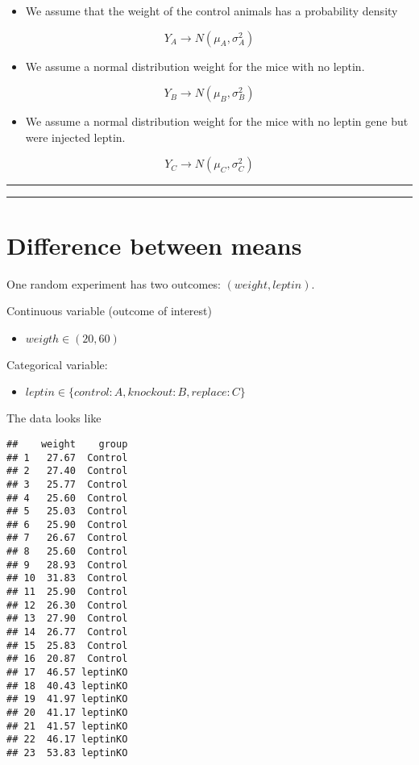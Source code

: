 \documentclass[
]{book}
\providecommand{\tightlist}{%
  \setlength{\itemsep}{0pt}\setlength{\parskip}{0pt}}
\begin{document}
\begin{itemize}
\tightlist
\item
  We assume that the weight of the control animals has a probability density
\end{itemize}

\[Y_A \rightarrow N(\mu_A, \sigma_A^2)\]

\begin{itemize}
\tightlist
\item
  We assume a normal distribution weight for the mice with no leptin.
\end{itemize}

\[Y_B \rightarrow N(\mu_B, \sigma_B^2)\]

\begin{itemize}
\tightlist
\item
  We assume a normal distribution weight for the mice with no leptin gene but were injected leptin.
\end{itemize}

\[Y_C \rightarrow N(\mu_C, \sigma_C^2)\]

\begin{center}\rule{0.5\linewidth}{0.5pt}\end{center}

\begin{center}\rule{0.5\linewidth}{0.5pt}\end{center}

\hypertarget{difference-between-means-8}{%
\section{Difference between means}\label{difference-between-means-8}}

One random experiment has two outcomes: \((weight, leptin)\).

Continuous variable (outcome of interest)

\begin{itemize}
\tightlist
\item
  \(weigth \in (20, 60)\)
\end{itemize}

Categorical variable:

\begin{itemize}
\tightlist
\item
  \(leptin \in \{control:A,knockout:B, replace:C\}\)
\end{itemize}

The data looks like

\begin{verbatim}
##    weight    group
## 1   27.67  Control
## 2   27.40  Control
## 3   25.77  Control
## 4   25.60  Control
## 5   25.03  Control
## 6   25.90  Control
## 7   26.67  Control
## 8   25.60  Control
## 9   28.93  Control
## 10  31.83  Control
## 11  25.90  Control
## 12  26.30  Control
## 13  27.90  Control
## 14  26.77  Control
## 15  25.83  Control
## 16  20.87  Control
## 17  46.57 leptinKO
## 18  40.43 leptinKO
## 19  41.97 leptinKO
## 20  41.17 leptinKO
## 21  41.57 leptinKO
## 22  46.17 leptinKO
## 23  53.83 leptinKO
\end{verbatim}
\end{document}
